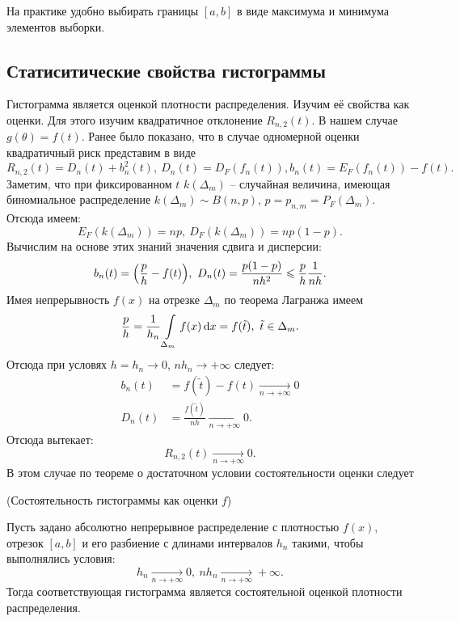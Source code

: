 \begin{remark}
    На практике удобно выбирать границы $[a, b]$ в виде максимума и минимума
    элементов выборки.
\end{remark}

\subsection{Статиситические свойства гистограммы}
Гистограмма является оценкой плотности распределения. Изучим её свойства как
оценки. Для этого изучим квадратичное отклонение $R_{n, 2}(t)$. В нашем случае
$g(\theta) = f(t)$. Ранее было показано, что в случае одномерной оценки
квадратичный риск представим в виде
\[
    R_{n, 2}(t) = D_n(t) + b^2_n(t),~ D_n(t) = D_F(f_n(t)),
    b_n(t) = E_F(f_n(t)) - f(t)
.\]
Заметим, что при фиксированном $t$ $k(\Delta_m)$ -- случайная величина,
имеющая биномиальное распределение $k(\Delta_m) \sim B(n, p)$, $p = p_{n, m}
= P_F(\Delta_m)$. Отсюда имеем:
\[
    E_F(k(\Delta_m)) = np,~ D_F(k(\Delta_m)) = np(1 - p)
.\]
Вычислим на основе этих знаний значения сдвига и дисперсии:
\[
    b_n(t) = \parens*{\frac{p}{h} - f(t)},~ D_n(t) = \frac{p(1 - p)}{n h^2}
    \leqslant \frac{p}{h} \frac{1}{nh}
.\]
Имея непрерывность $f(x)$ на отрезке $\Delta_m$ по теорема Лагранжа имеем
\[
    \frac{p}{h} = \frac{1}{h_n} \int\limits_{\Delta_m}{f(x) \,\mathrm{d} x} = f(\tilde{t}),~
    \tilde{t} \in \Delta_m
.\]
Отсюда при условях $h = h_n \to 0$, $nh_n \to +\infty$ следует:
\begin{align*}
    b_n(t) &= f(\tilde{t}) - f(t) \xrightarrow[n \to +\infty]{} 0 \\
    D_n(t) &= \frac{f(\tilde{t})}{nh} \xrightarrow[n \to +\infty]{} 0
.\end{align*}
Отсюда вытекает:
\[
    R_{n, 2}(t) \xrightarrow[n \to +\infty]{} 0
.\]
В этом случае по теореме о достаточном условии состоятельности оценки
следует

\begin{theorem}(Состоятельность гистограммы как оценки $f$)

    Пусть задано абсолютно непрерывное распределение с плотностью $f(x)$,
    отрезок $[a, b]$ и его разбиение с длинами интервалов $h_n$ такими,
    чтобы выполнялись условия:
    \[
        h_n \xrightarrow[n \to +\infty]{} 0,~ nh_n \xrightarrow[n \to +\infty]
        {} +\infty
    .\]
    Тогда соответствующая гистограмма является состоятельной оценкой плотности
    распределения.
\end{theorem}

